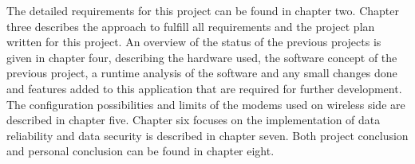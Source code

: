 The detailed requirements for this project can be found in chapter two. Chapter three describes the approach to fulfill all requirements and the project plan written for this project. An overview of the status of the previous projects is given in chapter four, describing the hardware used, the software concept of the previous project, a runtime analysis of the software and any small changes done and features added to this application that are required for further development. The configuration possibilities and limits of the modems used on wireless side are described in chapter five. Chapter six focuses on the implementation of data reliability and data security is described in chapter seven. Both project conclusion and personal conclusion can be found in chapter eight.